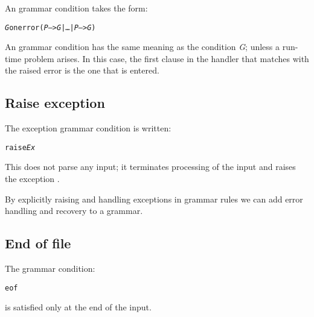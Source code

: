 An  grammar condition takes the form:
\begin{alltt}
\emph{G} onerror (\emph{P} --> \emph{G} | \ldots{} | \emph{P\subn} --> \emph{G\subn})
\end{alltt}
An  grammar condition has the same meaning as the condition \emph{G}; unless a run-time problem arises. In this case, the first clause in the handler that matches with the raised error is the one that is entered. 

\subsection{Raise exception}
\label{grammar:raise}

The  exception grammar condition is written:
\begin{alltt}
raise \emph{Ex}
\end{alltt}
This does not parse any input; it terminates processing of the input and raises the exception . 
\begin{aside}
By explicitly raising and handling exceptions in grammar rules we can add error handling and recovery to a grammar.
\end{aside}

\subsection{End of file}
\label{grammar:eof}

The  grammar condition:
\begin{alltt}
eof
\end{alltt}
is satisfied only at the end of the input.